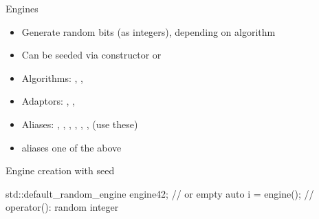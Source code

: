 \begin{frame}[fragile]
  \begin{block}{Engines}
    \begin{itemize}
      \item Generate random bits (as integers), depending on algorithm
      \item Can be seeded via constructor or 
      \item Algorithms:
        {\footnotesize {}, , }
      \item Adaptors:
        {\footnotesize {}, , }
      \item Aliases:
        {\footnotesize {}, , , , , , } (use these)
      \item {} aliases one of the above
    \end{itemize}
  \end{block}
  \begin{exampleblock}{Engine creation with seed}
    \begin{cppcode}
      std::default_random_engine engine{42}; // or empty
      auto i = engine(); // operator(): random integer
    \end{cppcode}
  \end{exampleblock}
\end{frame}


